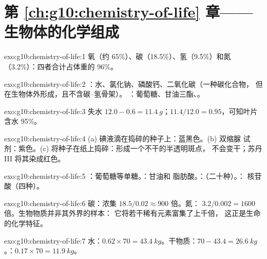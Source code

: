 \section*{第 \ref{ch:g10:chemistry-of-life} 章——生物体的化学组成}

\begin{solution}{exo:g10:chemistry-of-life:1}
氧（约 65\%）、碳（18.5\%）、氢（9.5\%）和氮
（3.2\%）：四者合计占体重的 96\%。
\end{solution}

\begin{solution}{exo:g10:chemistry-of-life:2}
：水、氯化钠、磷酸钙、二氧化碳（一种碳化合物，
但在生物体外形成，且不含碳–氢骨架）。
：葡萄糖、甘油三酯、。
\end{solution}

\begin{solution}{exo:g10:chemistry-of-life:3}
失水 $12.0 - 0.6 = \qty{11.4}{g}$；$11.4/12.0 = 0.95$，可知叶片
含水 95\%。
\end{solution}

\begin{solution}{exo:g10:chemistry-of-life:4}
(a) 碘液滴在捣碎的种子上：蓝黑色。(b) 双缩脲
试剂：紫色。(c) 将种子在纸上捣碎：形成一个不干的半透明斑点，
不会变干；苏丹 III 将其染成红色。
\end{solution}

\begin{solution}{exo:g10:chemistry-of-life:5}
：葡萄糖等单糖。：甘油和
脂肪酸。：（二十种）。：
核苷酸（四种）。
\end{solution}

\begin{solution}{exo:g10:chemistry-of-life:6}
碳：浓集 $18.5/0.02 \approx 900$ 倍。氮：
$3.2/0.002 = 1600$ 倍。生物物质并非其外界的样本：
它将若干稀有元素富集了上千倍，
这正是生命的化学特征。
\end{solution}

\begin{solution}{exo:g10:chemistry-of-life:7}
水：$0.62 \times 70 = \qty{43.4}{kg}$。干物质：$70 - 43.4 =
\qty{26.6}{kg}$。：$0.17 \times 70 = \qty{11.9}{kg}$。
\end{solution}

